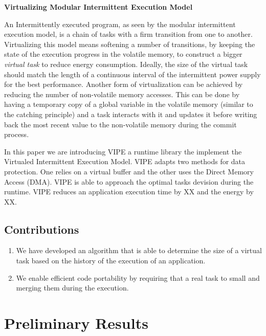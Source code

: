 \documentclass[pageno]{jpaper}
\newcommand{\sys}{VIPE\xspace}
\begin{document}
\noindent\textbf{Virtualizing Modular Intermittent Execution Model}

		An Intermittently executed program, as seen by the modular intermittent execution model, is a chain of tasks with a firm transition from one to another. 
		Virtualizing this model means softening a number of transitions, by keeping the state of the execution progress in the volatile memory, to construct a bigger \emph{virtual task} to reduce energy consumption. Ideally, the size of the virtual task should match the length of a continuous interval of the intermittent power supply for the best performance. Another form of virtualization can be achieved by reducing the number of non-volatile memory accesses. This can be done by having a temporary copy of a global variable in the volatile memory (similar to the catching principle) and a task interacts with it and updates it before writing back the most recent value to the non-volatile memory during the commit process.

		In this paper we are introducing \sys a runtime library the implement the Virtualed Intermittent Execution Model. \sys adapts two methods for data protection. One relies on a virtual buffer and the other uses the Direct Memory Access (DMA). \sys is able to approach the optimal tasks devision during the runtime. \sys reduces an application execution time by XX and the energy by XX. 


\subsection{Contributions}
	 \begin{enumerate}
		 \item We have developed an algorithm that is able to determine the size of a virtual task based on the history of the execution of an application. 
		 \item We enable efficient code portability by requiring that a real task to small and merging them during the execution.   
	\end{enumerate}


 \section{Preliminary Results}
 \label{sec:prelResults}
\end{document}
